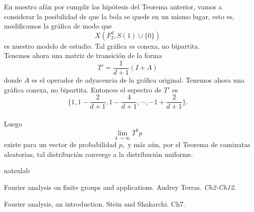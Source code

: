 \documentclass[a4paper,openright,10pt]{article}
\begin{document}
En nuestro af\'an por cumplir las hip\'otesis del Teorema anterior, vamos a considerar la posibilidad de que la bola se quede en un mismo lugar, esto es, modificamos la gr\'afica de modo que $$
X(\textit{F}_{2}^{d},S(1)\cup \{0\})
$$ es nuestro modelo de estudio. Tal gr\'afica es conexa, no bipartita.\\ Tenemos ahora una matriz de transici\'on de la forma $$
T'=\frac{1}{d+1}(I+A)
$$ donde $A$ es el operador de adyacencia de la gr\'afica original. Tenemos ahora una gr\'afica conexa, no bipartita. Entonces el espectro de $T'$ es $$
\{1,1-\frac{2}{d+1},1-\frac{4}{d+1},\cdots, -1+\frac{2}{d+1}\}.
$$\\
Luego $$
\lim\limits_{k\rightarrow \infty}T^{k}p
$$ existe para un vector de probabilidad $p,$ y m\'as a\'un, por el Teorema de caminatas aleatorias, tal distribuci\'on converge a la distribuci\'on uniforme.\\
\begin{thebibliography}{96}
\expandafter\ifx\csname
natexlab\endcsname\relax\def\natexlab#1{#1}\fi

Fourier analysis on finite groups and applications. Audrey Terras. \textit{Ch2-Ch12.}

Fourier analysis, an introduction. {Stein and Shakarchi.} Ch7.

\end{thebibliography}
\end{document}
